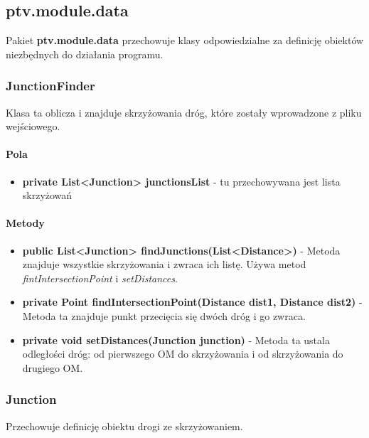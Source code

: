 \documentclass[]{article}
\begin{document}
        
        \subsection{ptv.module.data} %
        Pakiet \textbf{ptv.module.data} przechowuje klasy odpowiedzialne za definicję obiektów niezbędnych do działania programu.
        
            \subsubsection{JunctionFinder}
                    Klasa ta oblicza i znajduje skrzyżowania dróg, które zostały wprowadzone z pliku wejściowego.
                \paragraph{Pola}
                    \begin{itemize}
                        \item \textbf{private List<Junction> junctionsList} - tu przechowywana jest lista skrzyżowań
                    \end{itemize}
            
                \paragraph{Metody}
                    \begin{itemize}
                        \item \textbf{public List<Junction> findJunctions(List<Distance>)} -
                            Metoda znajduje wszystkie skrzyżowania i zwraca ich listę. Używa metod \textit{fintIntersectionPoint} i 
                            \textit{setDistances}.
                        \item \textbf{private Point findIntersectionPoint(Distance dist1, Distance dist2)} - 
                            Metoda ta znajduje punkt przecięcia się dwóch dróg i go zwraca.
                        \item \textbf{private void setDistances(Junction junction)} - 
                            Metoda ta ustala odległości dróg: od pierwszego OM do skrzyżowania i od skrzyżowania do drugiego OM.
                    \end{itemize}
                    
            \subsubsection{Junction}
                Przechowuje definicję obiektu drogi ze skrzyżowaniem.
                    
\end{document}
